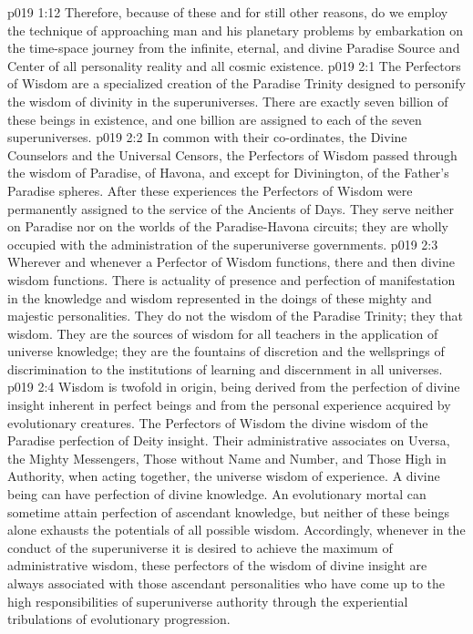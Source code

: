 \pc \vs p019 1:12 Therefore, because of these and for still other reasons, do we employ the technique of approaching man and his planetary problems by embarkation on the time\hyp{}space journey from the infinite, eternal, and divine Paradise Source and Center of all personality reality and all cosmic existence.
\vs p019 2:1 The Perfectors of Wisdom are a specialized creation of the Paradise Trinity designed to personify the wisdom of divinity in the superuniverses. There are exactly seven billion of these beings in existence, and one billion are assigned to each of the seven superuniverses.
\vs p019 2:2 In common with their co\hyp{}ordinates, the Divine Counselors and the Universal Censors, the Perfectors of Wisdom passed through the wisdom of Paradise, of Havona, and except for Divinington, of the Father’s Paradise spheres. After these experiences the Perfectors of Wisdom were permanently assigned to the service of the Ancients of Days. They serve neither on Paradise nor on the worlds of the Paradise\hyp{}Havona circuits; they are wholly occupied with the administration of the superuniverse governments.
\pc \vs p019 2:3 Wherever and whenever a Perfector of Wisdom functions, there and then divine wisdom functions. There is actuality of presence and perfection of manifestation in the knowledge and wisdom represented in the doings of these mighty and majestic personalities. They do not  the wisdom of the Paradise Trinity; they  that wisdom. They are the sources of wisdom for all teachers in the application of universe knowledge; they are the fountains of discretion and the wellsprings of discrimination to the institutions of learning and discernment in all universes.\plusone
\vs p019 2:4 Wisdom is twofold in origin, being derived from the perfection of divine insight inherent in perfect beings and from the personal experience acquired by evolutionary creatures. The Perfectors of Wisdom  the divine wisdom of the Paradise perfection of Deity insight. Their administrative associates on Uversa, the Mighty Messengers, Those without Name and Number, and Those High in Authority, when acting together,  the universe wisdom of experience. A divine being can have perfection of divine knowledge. An evolutionary mortal can sometime attain perfection of ascendant knowledge, but neither of these beings alone exhausts the potentials of all possible wisdom. Accordingly, whenever in the conduct of the superuniverse it is desired to achieve the maximum of administrative wisdom, these perfectors of the wisdom of divine insight are always associated with those ascendant personalities who have come up to the high responsibilities of superuniverse authority through the experiential tribulations of evolutionary progression.
